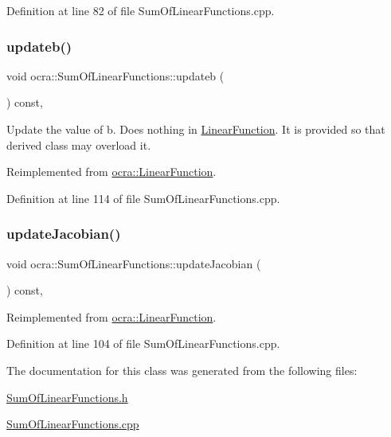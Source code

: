 Definition at line 82 of file Sum\+Of\+Linear\+Functions.\+cpp.

\hypertarget{classocra_1_1SumOfLinearFunctions_ad28c3b6f03dbe68080c06c0d9e4abffa}{}\label{classocra_1_1SumOfLinearFunctions_ad28c3b6f03dbe68080c06c0d9e4abffa} 
\subsubsection{\texorpdfstring{updateb()}{updateb()}}
{\footnotesize\ttfamily void ocra\+::\+Sum\+Of\+Linear\+Functions\+::updateb (\begin{DoxyParamCaption}{ }\end{DoxyParamCaption}) const\hspace{0.3cm}{\ttfamily [protected]}, {\ttfamily [virtual]}}

Update the value of b. Does nothing in \hyperlink{classocra_1_1LinearFunction}{Linear\+Function}. It is provided so that derived class may overload it. 

Reimplemented from \hyperlink{classocra_1_1LinearFunction_a546454cd8d0909f99433ffc0e700c9e3}{ocra\+::\+Linear\+Function}.



Definition at line 114 of file Sum\+Of\+Linear\+Functions.\+cpp.

\hypertarget{classocra_1_1SumOfLinearFunctions_a4597593267a02c2087ea84a327eae5dc}{}\label{classocra_1_1SumOfLinearFunctions_a4597593267a02c2087ea84a327eae5dc} 
\subsubsection{\texorpdfstring{update\+Jacobian()}{updateJacobian()}}
{\footnotesize\ttfamily void ocra\+::\+Sum\+Of\+Linear\+Functions\+::update\+Jacobian (\begin{DoxyParamCaption}{ }\end{DoxyParamCaption}) const\hspace{0.3cm}{\ttfamily [protected]}, {\ttfamily [virtual]}}



Reimplemented from \hyperlink{classocra_1_1LinearFunction_a30926f977c0124a0b0f65b854ab39636}{ocra\+::\+Linear\+Function}.



Definition at line 104 of file Sum\+Of\+Linear\+Functions.\+cpp.



The documentation for this class was generated from the following files\+:\begin{DoxyCompactItemize}
\item 
\hyperlink{SumOfLinearFunctions_8h}{Sum\+Of\+Linear\+Functions.\+h}\item 
\hyperlink{SumOfLinearFunctions_8cpp}{Sum\+Of\+Linear\+Functions.\+cpp}\end{DoxyCompactItemize}
